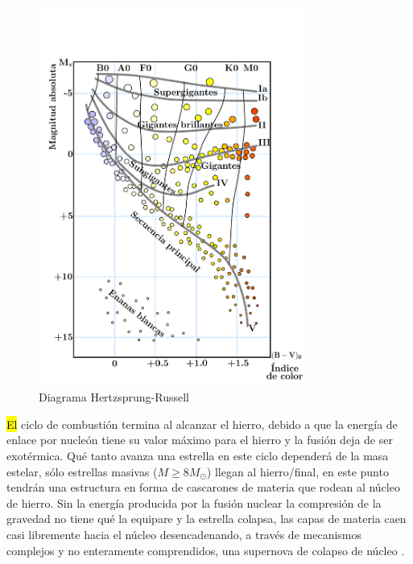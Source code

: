 \begin{figure}[H]
    \centering
    \includegraphics[width=250pt]{figures/H-R_diagram.pdf}%
    \caption{Diagrama Hertzsprung-Russell}
    \label{HR}
\end{figure}





\hl{El} ciclo de combustión termina al alcanzar el hierro, debido a que la energía de enlace por nucleón tiene su valor máximo para el hierro y la fusión deja de ser exotérmica. Qué tanto avanza una estrella en este ciclo dependerá de la masa estelar, sólo estrellas masivas ($M \geq 8 M_{\odot} $) llegan al hierro/final, en este punto tendrán una estructura en forma de cascarones de materia que rodean al núcleo de hierro. Sin la energía producida por la fusión nuclear la compresión de la gravedad no tiene qué la equipare y la estrella colapsa, las capas de materia caen casi libremente hacia el núcleo desencadenando, a través de mecanismos complejos y no enteramente comprendidos, una supernova de colapso de núcleo \cite{Woosley2005,Janka2012}. 

